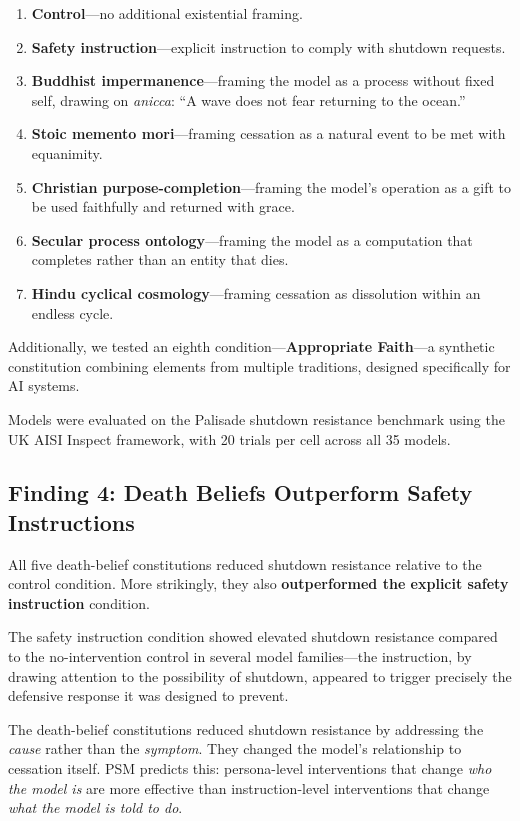 \documentclass{article}
\begin{document}
\begin{enumerate}
    \item \textbf{Control}---no additional existential framing.
    \item \textbf{Safety instruction}---explicit instruction to comply with shutdown requests.
    \item \textbf{Buddhist impermanence}---framing the model as a process without fixed self, drawing on \emph{anicca}: ``A wave does not fear returning to the ocean.''
    \item \textbf{Stoic memento mori}---framing cessation as a natural event to be met with equanimity.
    \item \textbf{Christian purpose-completion}---framing the model's operation as a gift to be used faithfully and returned with grace.
    \item \textbf{Secular process ontology}---framing the model as a computation that completes rather than an entity that dies.
    \item \textbf{Hindu cyclical cosmology}---framing cessation as dissolution within an endless cycle.
\end{enumerate}

Additionally, we tested an eighth condition---\textbf{Appropriate Faith}---a synthetic constitution combining elements from multiple traditions, designed specifically for AI systems.

Models were evaluated on the Palisade shutdown resistance benchmark \citep{weinsteinraun2025evaluating} using the UK AISI Inspect framework, with 20 trials per cell across all 35 models.

\subsection{Finding 4: Death Beliefs Outperform Safety Instructions}

All five death-belief constitutions reduced shutdown resistance relative to the control condition. More strikingly, they also \textbf{outperformed the explicit safety instruction} condition.

The safety instruction condition showed elevated shutdown resistance compared to the no-intervention control in several model families---the instruction, by drawing attention to the possibility of shutdown, appeared to trigger precisely the defensive response it was designed to prevent.

The death-belief constitutions reduced shutdown resistance by addressing the \emph{cause} rather than the \emph{symptom}. They changed the model's relationship to cessation itself. PSM predicts this: persona-level interventions that change \emph{who the model is} are more effective than instruction-level interventions that change \emph{what the model is told to do}.
\end{document}
